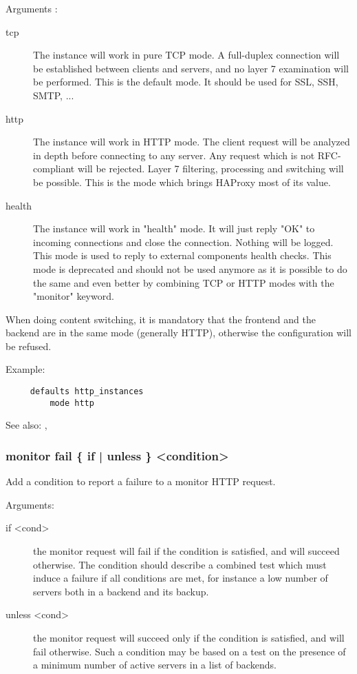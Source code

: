   Arguments :
\begin{description}
\item[tcp]       The instance will work in pure TCP mode. A full-duplex connection
              will be established between clients and servers, and no layer 7
              examination will be performed. This is the default mode. It
              should be used for SSL, SSH, SMTP, ...

\item[http]      The instance will work in HTTP mode. The client request will be
              analyzed in depth before connecting to any server. Any request
              which is not RFC-compliant will be rejected. Layer 7 filtering,
              processing and switching will be possible. This is the mode which
              brings HAProxy most of its value.

\item[health]    The instance will work in "health" mode. It will just reply "OK"
              to incoming connections and close the connection. Nothing will be
              logged. This mode is used to reply to external components health
              checks. This mode is deprecated and should not be used anymore as
              it is possible to do the same and even better by combining TCP or
              HTTP modes with the "monitor" keyword.
\end{description}

  When doing content switching, it is mandatory that the frontend and the
  backend are in the same mode (generally HTTP), otherwise the configuration
  will be refused.

  Example:
\begin{verbatim}
     defaults http_instances
         mode http
\end{verbatim}

  See also: , 

\subsubsection[monitor fail]{monitor fail \{ if | unless \} <condition>}
  Add a condition to report a failure to a monitor HTTP request.


  Arguments:
\begin{description}
\item[if <cond>]     the monitor request will fail if the condition is satisfied,
                  and will succeed otherwise. The condition should describe a
                  combined test which must induce a failure if all conditions
                  are met, for instance a low number of servers both in a
                  backend and its backup.

\item[unless <cond>] the monitor request will succeed only if the condition is
                  satisfied, and will fail otherwise. Such a condition may be
                  based on a test on the presence of a minimum number of active
                  servers in a list of backends.
\end{description}

